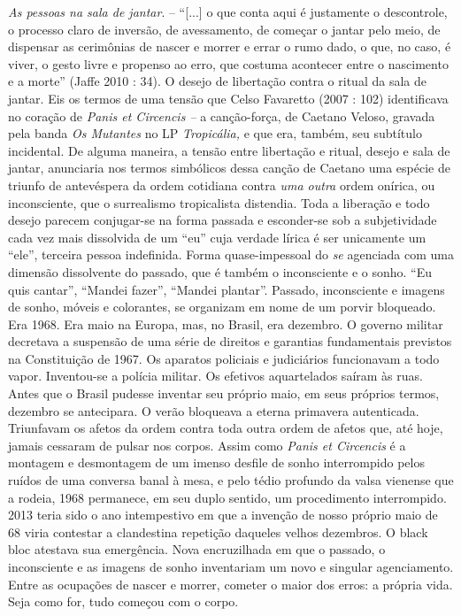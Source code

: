 \emph{As pessoas na sala de jantar}. -- ``{[}...{]} o que conta aqui é
justamente o descontrole, o processo claro de inversão, de avessamento,
de começar o jantar pelo meio, de dispensar as cerimônias de nascer e
morrer e errar o rumo dado, o que, no caso, é viver, o gesto livre e
propenso ao erro, que costuma acontecer entre o nascimento e a morte''
(Jaffe 2010 : 34). O desejo de libertação contra o ritual da sala de
jantar. Eis os termos de uma tensão que Celso Favaretto (2007 : 102)
identificava no coração de \emph{Panis et Circencis --} a canção-força,
de Caetano Veloso, gravada pela banda \emph{Os Mutantes }no LP
\emph{Tropicália, }e que era, também, seu subtítulo incidental. De
alguma maneira, a tensão entre libertação e ritual, desejo e sala de
jantar, anunciaria nos termos simbólicos dessa canção de Caetano uma
espécie de triunfo de antevéspera da ordem cotidiana contra \emph{uma
outra} ordem onírica, ou inconsciente, que o surrealismo tropicalista
distendia. Toda a liberação e todo desejo parecem conjugar-se na forma
passada e esconder-se sob a subjetividade cada vez mais dissolvida de um
``eu'' cuja verdade lírica é ser unicamente um ``ele'', terceira pessoa
indefinida. Forma quase-impessoal do \emph{se} agenciada com uma
dimensão dissolvente do passado, que é também o inconsciente e o sonho.
``Eu quis cantar'', ``Mandei fazer'', ``Mandei plantar''. Passado,
inconsciente e imagens de sonho, móveis e colorantes, se organizam em
nome de um porvir bloqueado. Era 1968. Era maio na Europa, mas, no
Brasil, era dezembro. O governo militar decretava a suspensão de uma
série de direitos e garantias fundamentais previstos na Constituição de
1967. Os aparatos policiais e judiciários funcionavam a todo vapor.
Inventou-se a polícia militar. Os efetivos aquartelados saíram às ruas.
Antes que o Brasil pudesse inventar seu próprio maio, em seus próprios
termos, dezembro se antecipara. O verão bloqueava a eterna primavera
autenticada. Triunfavam os afetos da ordem contra toda outra ordem de
afetos que, até hoje, jamais cessaram de pulsar nos corpos. Assim como
\emph{Panis et Circencis} é a montagem e desmontagem de um imenso
desfile de sonho interrompido pelos ruídos de uma conversa banal à mesa,
e pelo tédio profundo da valsa vienense que a rodeia, 1968 permanece, em
seu duplo sentido, um procedimento interrompido. 2013 teria sido o ano
intempestivo em que a invenção de nosso próprio maio de 68 viria
contestar a clandestina repetição daqueles velhos dezembros. O black
bloc atestava sua emergência. Nova encruzilhada em que o passado, o
inconsciente e as imagens de sonho inventariam um novo e singular
agenciamento. Entre as ocupações de nascer e morrer, cometer o maior dos
erros: a própria vida. Seja como for, tudo começou com o corpo.

